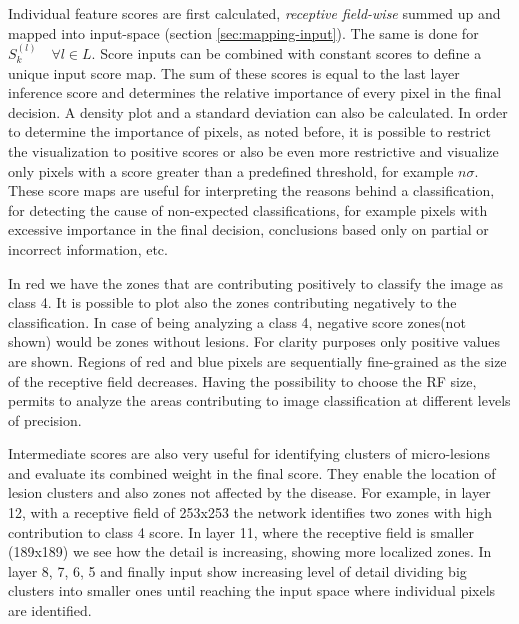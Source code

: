 \documentclass[review]{elsarticle}
\theoremstyle{definition} %
\theoremstyle{remark}
\begin{document}
Individual feature scores are first calculated, \emph{receptive field-wise} summed up and mapped into input-space (section \ref{sec:mapping-input}). The same is done for $S_k^{(l)} \quad \forall l \in L$. Score inputs can be combined with constant scores to define a unique input score map. The sum of these scores is equal to the last layer inference score and determines the relative importance of every pixel in the final decision. A density plot and a standard deviation can also be calculated. In order to determine the importance of pixels, as noted before, it is possible to restrict the visualization to positive scores or also be even more restrictive and visualize only pixels with a score greater than a predefined threshold, for example $n \sigma$. These score maps are useful for interpreting the reasons behind a classification, for detecting the cause of non-expected classifications, for example pixels with excessive importance in the final decision, conclusions based only on partial or incorrect information, etc. 

In red we have the zones that are contributing positively to classify the image as class 4. It is possible to plot also the zones contributing negatively to the classification. In case of being analyzing a class 4, negative score zones(not shown) would be zones without lesions. For clarity purposes only positive values are shown. Regions of red and blue pixels are sequentially fine-grained as the size of the receptive field decreases. Having the possibility to choose the RF size, permits to analyze the areas contributing to image classification at different levels of precision.

Intermediate scores are also very useful for identifying clusters of micro-lesions and evaluate its combined weight in the final score. They enable the location of lesion clusters and also zones not affected by the disease. For example, in layer 12, with a receptive field of 253x253 the network identifies two zones with high contribution to class 4 score. In layer 11, where the receptive field is smaller (189x189) we see how the detail is increasing, showing more localized zones. In layer 8, 7, 6, 5 and finally input show increasing level of detail dividing big clusters into smaller ones until reaching the input space where individual pixels are identified.
\end{document}
